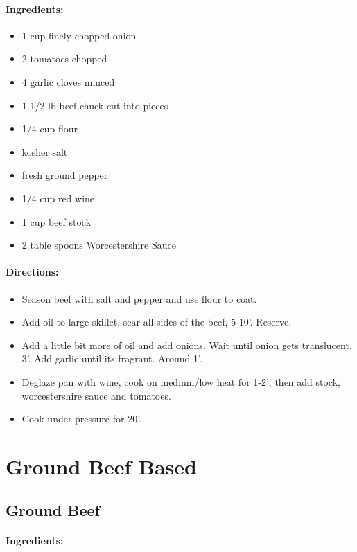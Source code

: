 \documentclass{article}
\begin{document}
\paragraph{Ingredients:}
\begin{itemize}
  \item 1 cup finely chopped onion
  \item 2 tomatoes chopped
  \item 4 garlic cloves minced
  \item 1 1/2 lb beef chuck cut into pieces
  \item 1/4 cup flour
  \item kosher salt
  \item fresh ground pepper
  \item 1/4 cup red wine
  \item 1 cup beef stock
  \item 2 table spoons Worcestershire Sauce	
\end{itemize}

\paragraph{Directions:}
\begin{itemize}
  \item Season beef with salt and pepper and use flour to coat.
  \item Add oil to large skillet, sear all sides of the beef, 5-10’. Reserve.
  \item Add a little bit more of oil and add onions. Wait until onion gets translucent. 3’. Add garlic until its
fragrant. Around 1’.
  \item Deglaze pan with wine, cook on medium/low heat for 1-2’, then add stock, worcestershire sauce and
tomatoes.
  \item Cook under pressure for 20’.
\end{itemize}

\section{Ground Beef Based}

\subsection{Ground Beef}

\paragraph{Ingredients:}
\end{document}
